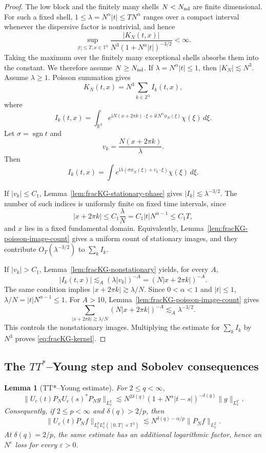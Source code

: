 \documentclass[10pt]{amsart}
\numberwithin{equation}{section}
\theoremstyle{plain}
\newtheorem{lemma}[theorem]{Lemma}
\theoremstyle{definition}
\theoremstyle{remark}
\newcommand{\eps}{\varepsilon}
\newcommand{\ii}{\mathrm{i}}
\begin{document}
\begin{proof}
The low block and the finitely many shells $N<N_{\rm nd}$ are finite dimensional.  For such a fixed shell, $1\le\lambda=N^\alpha|t|\le TN^\alpha$ ranges over a compact interval whenever the dispersive factor is nontrivial, and hence
\[
        \sup_{|t|\le T,x\in\mathbb T^3}
        \frac{|K_N(t,x)|}{N^3(1+N^\alpha|t|)^{-3/2}}<\infty.
\]
Taking the maximum over the finitely many exceptional shells absorbs them into the constant.  We therefore assume $N\ge N_{\rm nd}$.  If $\lambda=N^\alpha|t|\le1$, then $|K_N|\lesssim N^3$.  Assume $\lambda\ge1$.  Poisson summation gives
\[
        K_N(t,x)=N^3\sum_{k\in\mathbb Z^3}I_k(t,x),
\]
where
\[
        I_k(t,x)=\int_{\mathbb R^3}
        e^{\ii N(x+2\pi k)\cdot\xi+\ii tN^\alpha\phi_N(\xi)}\chi(\xi)\,d\xi.
\]
Let $\sigma=\operatorname{sgn}t$ and
\[
        v_k=\frac{N(x+2\pi k)}{\lambda}.
\]
Then
\[
        I_k(t,x)=\int e^{\ii\lambda(\sigma\phi_N(\xi)+v_k\cdot\xi)}\chi(\xi)\,d\xi.
\]

If $|v_k|\le C_1$, Lemma~\ref{lem:fracKG-stationary-phase} gives $|I_k|\lesssim\lambda^{-3/2}$.  The number of such indices is uniformly finite on fixed time intervals, since
\[
        |x+2\pi k|\le C_1\frac{\lambda}{N}
        =C_1|t|N^{\alpha-1}\le C_1T,
\]
and $x$ lies in a fixed fundamental domain.  Equivalently, Lemma~\ref{lem:fracKG-poisson-image-count} gives a uniform count of stationary images, and they contribute $O_T(\lambda^{-3/2})$ to $\sum_k I_k$.

If $|v_k|>C_1$, Lemma~\ref{lem:fracKG-nonstationary} yields, for every $A$,
\[
        |I_k(t,x)|\lesssim_A(\lambda|v_k|)^{-A}
        =(N|x+2\pi k|)^{-A}.
\]
The same condition implies $|x+2\pi k|\gtrsim\lambda/N$.  Since $0<\alpha<1$ and $|t|\le1$, $\lambda/N=|t|N^{\alpha-1}\le1$.  For $A>10$, Lemma~\ref{lem:fracKG-poisson-image-count} gives
\[
        \sum_{|x+2\pi k|\gtrsim\lambda/N}(N|x+2\pi k|)^{-A}
        \lesssim_A \lambda^{-3/2}.
\]
This controls the nonstationary images.  Multiplying the estimate for $\sum_kI_k$ by $N^3$ proves \eqref{eq:fracKG-kernel}.
\end{proof}

\subsection{The \texorpdfstring{$TT^*$}{TT*}--Young step and Sobolev consequences}

\begin{lemma}[TT*--Young estimate]\label{lem:fracKG-ttstar-young}
For $2\le q<\infty$,
\begin{equation}\label{eq:fracKG-interp}
        \|U_c(t)P_NU_c(s)^*P_Ng\|_{L_x^q}
        \lesssim
        N^{2\delta(q)}(1+N^\alpha|t-s|)^{-\delta(q)}
        \|g\|_{L_x^{q'}}.
\end{equation}
Consequently, if $2\le p<\infty$ and $\delta(q)>2/p$, then
\[
        \|U_c(t)P_Nf\|_{L_t^pL_x^q([0,T]\times\mathbb T^3)}
        \lesssim
        N^{\delta(q)-\alpha/p}\|P_Nf\|_{L_x^2}.
\]
At $\delta(q)=2/p$, the same estimate has an additional logarithmic factor, hence an $N^\eps$ loss for every $\eps>0$.
\end{lemma}
\end{document}
